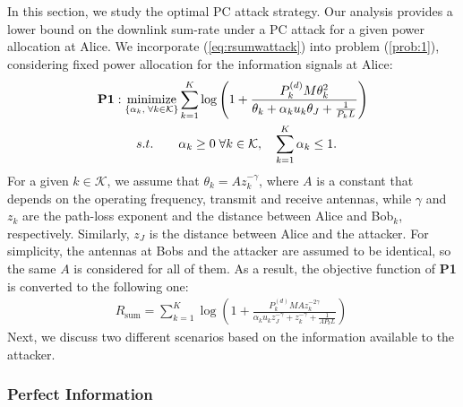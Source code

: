 \documentclass[draftclsnofoot, 12pt, onecolumn, journal]{IEEEtran}
\begin{document}
In this section, we study the optimal PC attack strategy.
Our analysis provides a lower bound on the downlink sum-rate under a PC attack for a given power allocation at Alice.
We incorporate (\ref{eq:rsumwattack}) into problem (\ref{prob:1}), considering fixed power allocation for the information signals at Alice:
%
\begin{align*}
\textbf{P1}:
 \underset{ 
\begin{subarray} \\
\{\alpha_k, \; \forall k \in \mathcal{K} \} \end{subarray} }{\text{minimize}} 
& \sum_{k = 1}^K \log \left( 1 + \frac{P_k^{(d)} M \theta_k^2}{\theta_k + \alpha_k u_k \theta_J + \frac{1}{P_k L}} \right)  \\
 s.t. \quad \quad & \alpha_k \geq 0   \; \forall k \in \mathcal{K}, \quad \sum_{k = 1}^K \alpha_k \leq 1. \nonumber 
\end{align*}
%
For a given $k \in \mathcal{K}$, we assume that $\theta_k = A z_k^{-\gamma}$, where $A$ is a constant that depends on the operating frequency, transmit and receive antennas, while $\gamma$ and $z_k$ are the path-loss exponent and the distance between Alice and Bob$_k$, respectively.
Similarly, $z_J$ is the distance between Alice and the attacker.
For simplicity, the antennas at Bobs and the attacker are assumed to be identical, so the same $A$ is considered for all of them.
As a result, the objective function of \textbf{P1} is converted to the following one:
%
\begin{align}
R_{\mathrm{sum}} = \sum_{k=1}^K \log \left( 1 +  \frac{ P_k^{(d)} M A z_k^{-2\gamma}}{ \alpha_k u_k z_J^{-\gamma} + z_k^{-\gamma} + \frac{1}{A P_k L}  } \right)
\
\label{eq:rsum}
\end{align}
%
Next, we discuss two different scenarios based on the information available to the attacker.


\subsubsection{Perfect Information}
\end{document}

